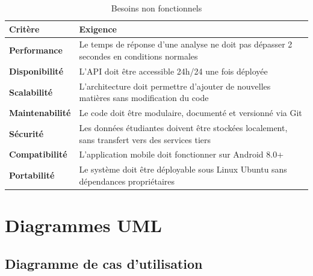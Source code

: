 \begin{table}[H]
\centering
\caption{Besoins non fonctionnels}
\label{tab:bnf}
\renewcommand{\arraystretch}{1.4}
\begin{tabular}{>{\bfseries}p{3cm} p{10cm}}
\toprule
\rowcolor{bleuprincipal!15}
\textbf{Critère} & \textbf{Exigence} \\
\midrule
Performance & Le temps de réponse d'une analyse ne doit pas dépasser 2 secondes en conditions normales \\
\midrule
\rowcolor{gray!8}
Disponibilité & L'API doit être accessible 24h/24 une fois déployée \\
\midrule
Scalabilité & L'architecture doit permettre d'ajouter de nouvelles matières sans modification du code \\
\midrule
\rowcolor{gray!8}
Maintenabilité & Le code doit être modulaire, documenté et versionné via Git \\
\midrule
Sécurité & Les données étudiantes doivent être stockées localement, sans transfert vers des services tiers \\
\midrule
\rowcolor{gray!8}
Compatibilité & L'application mobile doit fonctionner sur Android 8.0+ \\
\midrule
Portabilité & Le système doit être déployable sous Linux Ubuntu sans dépendances propriétaires \\
\bottomrule
\end{tabular}
\end{table}

\section{Diagrammes UML}

\subsection{Diagramme de cas d'utilisation}

